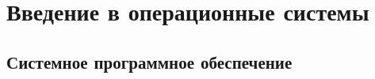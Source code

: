 \newpage %
\chapter{Введение в операционные системы}%


\section{Системное программное обеспечение}%


